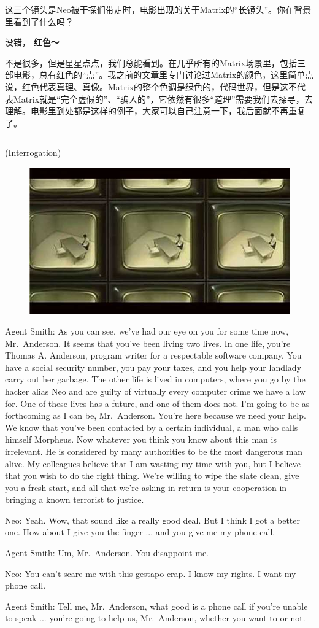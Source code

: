 \documentclass{ctexart}
\newcommand{\myparsep}{\noindent \rule[0.5ex]{\linewidth}{1pt}}
\newenvironment{myquote}{\color{green} \setlength{\leftskip}{6em} \setlength{\rightskip}{4em} \setlength{\parindent}{-2em}}{\par}
\begin{document}
这三个镜头是Neo被干探们带走时，电影出现的关于Matrix的“长镜头”。你在背景里看到了什么吗？

没错，{\color{red} \bf 红色～}

不是很多，但是星星点点，我们总能看到。在几乎所有的Matrix场景里，包括三部电影，总有红色的“点”。我之前的文章里专门讨论过Matrix的颜色，这里简单点说，红色代表真理、真像。Matrix的整个色调是绿色的，代码世界，但是这不代表Matrix就是“完全虚假的”、“骗人的”，它依然有很多“道理”需要我们去探寻，去理解。电影里到处都是这样的例子，大家可以自己注意一下，我后面就不再重复了。

\myparsep

\begin{myquote}
(Interrogation)

\begin{figure}[htb]
\centering
\includegraphics[width=0.5\linewidth]{fig/read_Matrix-15}
\end{figure}

Agent Smith: As you can see, we've had our eye on you for some time now, Mr.~Anderson. It seems that you've been living two lives. In one life, you're Thomas A. Anderson, program writer for a respectable software company. You have a social security number, you pay your taxes, and you help your landlady carry out her garbage. The other life is lived in computers, where you go by the hacker alias Neo and are guilty of virtually every computer crime we have a law for. One of these lives has a future, and one of them does not. I'm going to be as forthcoming as I can be, Mr.~Anderson. You're here because we need your help. We know that you've been contacted by a certain individual, a man who calls himself Morpheus. Now whatever you think you know about this man is irrelevant. He is considered by many authorities to be the most dangerous man alive. My colleagues believe that I am wasting my time with you, but I believe that you wish to do the right thing. We're willing to wipe the slate clean, give you a fresh start, and all that we're asking in return is your cooperation in bringing a known terrorist to justice.

Neo: Yeah. Wow, that sound like a really good deal. But I think I got a better one. How about I give you the finger ... and you give me my phone call.

Agent Smith: Um, Mr.~Anderson. You disappoint me.

Neo: You can't scare me with this gestapo crap. I know my rights. I want my phone call.

Agent Smith: Tell me, Mr.~Anderson, what good is a phone call if you're unable to speak ... you're going to help us, Mr.~Anderson, whether you want to or not.
\end{myquote}
\end{document}
